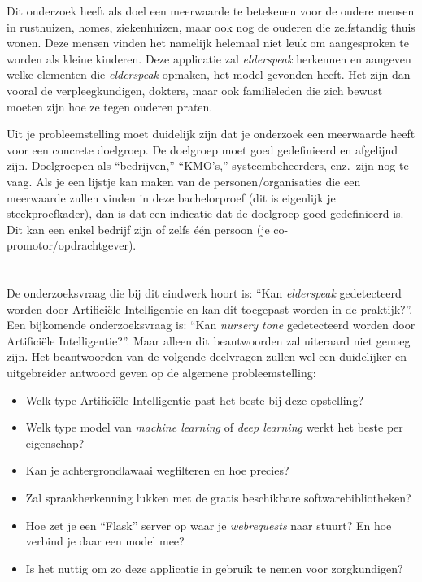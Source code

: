 Dit onderzoek heeft als doel een meerwaarde te betekenen voor de oudere mensen in rusthuizen, homes, ziekenhuizen, maar ook nog de ouderen die zelfstandig thuis wonen. Deze mensen vinden het namelijk helemaal niet leuk om aangesproken te worden als kleine kinderen. Deze applicatie zal \textit{elderspeak} herkennen en aangeven welke elementen die \textit{elderspeak} opmaken, het model gevonden heeft. Het zijn dan vooral de verpleegkundigen, dokters, maar ook familieleden die zich bewust moeten zijn hoe ze tegen ouderen praten.

\color{blue}
Uit je probleemstelling moet duidelijk zijn dat je onderzoek een meerwaarde heeft voor een concrete doelgroep. De doelgroep moet goed gedefinieerd en afgelijnd zijn. Doelgroepen als ``bedrijven,'' ``KMO's,'' systeembeheerders, enz.~zijn nog te vaag. Als je een lijstje kan maken van de personen/organisaties die een meerwaarde zullen vinden in deze bachelorproef (dit is eigenlijk je steekproefkader), dan is dat een indicatie dat de doelgroep goed gedefinieerd is. Dit kan een enkel bedrijf zijn of zelfs één persoon (je co-promotor/opdrachtgever).

\color{black}

\section{}
\label{sec:onderzoeksvraag}

De onderzoeksvraag die bij dit eindwerk hoort is: ``Kan \textit{elderspeak} gedetecteerd worden door Artificiële Intelligentie en kan dit toegepast worden in de praktijk?''. Een bijkomende onderzoeksvraag is: ``Kan \textit{nursery tone} gedetecteerd worden door Artificiële Intelligentie?''. Maar alleen dit beantwoorden zal uiteraard niet genoeg zijn. Het beantwoorden van de volgende deelvragen zullen wel een duidelijker en uitgebreider antwoord geven op de algemene probleemstelling:
\begin{itemize}
    \item Welk type Artificiële Intelligentie past het beste bij deze opstelling?
    \item Welk type model van \textit{machine learning} of \textit{deep learning} werkt het beste per eigenschap?
    \item Kan je achtergrondlawaai wegfilteren en hoe precies?
    \item Zal spraakherkenning lukken met de gratis beschikbare softwarebibliotheken?
    \item Hoe zet je een ``Flask'' server op waar je \textit{webrequests} naar stuurt? En hoe verbind je daar een model mee?
    \item Is het nuttig om zo deze applicatie in gebruik te nemen voor zorgkundigen?
\end{itemize}

